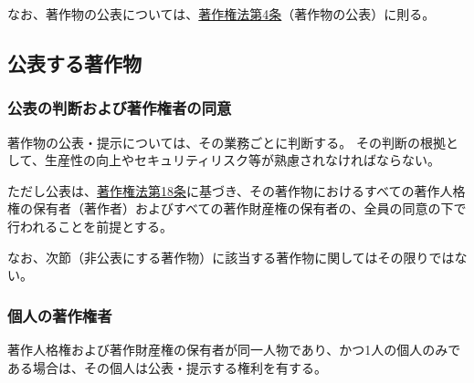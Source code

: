 なお、著作物の公表については、\href{https://elaws.e-gov.go.jp/document?lawid=345AC0000000048\#Mp-At_4}{著作権法第4条}（著作物の公表）\cite{online:eGovCopyrightLaw}に則る。


\subsection{公表する著作物}

\subsubsection{公表の判断および著作権者の同意}
著作物の公表・提示については、その業務ごとに判断する。
その判断の根拠として、生産性の向上やセキュリティリスク等が熟慮されなければならない。

ただし公表は、\href{https://elaws.e-gov.go.jp/document?lawid=345AC0000000048\#Mp-At_2}{著作権法第18条}に基づき、その著作物におけるすべての著作人格権の保有者（著作者）およびすべての著作財産権の保有者の、全員の同意の下で行われることを前提とする。

なお、次節（非公表にする著作物）に該当する著作物に関してはその限りではない。

\subsubsection{個人の著作権者}%
著作人格権および著作財産権の保有者が同一人物であり、かつ1人の個人のみである場合は、その個人は公表・提示する権利を有する。

